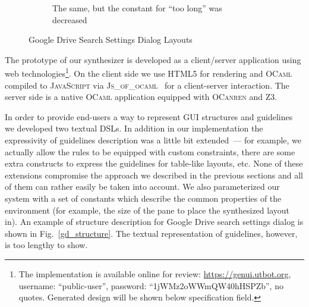 \begin{figure}[t]
\begin{subfigure}[t]{.45\textwidth}
      \caption{The same, but the constant for ``too long'' was decreased}
    \end{subfigure}
    \caption{Google Drive Search Settings Dialog Layouts}
    \label{fig:QMLtwoGuidelines}
\end{figure}

\newcommand{\OCaml}{\textsc{OCaml}\xspace}
\newcommand{\OCanren}{\textsc{OCanren}\xspace}
\newcommand{\noCanren}{\textsc{noCanren}\xspace}
\newcommand{\Zthree}{\textsc{Z3}\xspace}
\newcommand{\JSOO}{\textsc{Js\_of\_ocaml}\xspace}


The prototype of our synthesizer is developed as a \mbox{client}/server application using web technologies\footnote{The implementation is available online
for review: \url{https://genui.utbot.org}, username: ``public-user'', password: ``1jWMz2oWWmQW40hHSPZb'', no quotes.
Generated design will be shown below specification field.}.
On the client side we use \textsc{HTML5} for rendering and \OCaml
compiled to \textsc{JavaScript} via \JSOO~\cite{JSOO} for a client-server interaction. The server side is a native \OCaml application equipped with \OCanren and \Zthree.

In order to provide end-users a way to represent GUI structures and guidelines we developed two textual DSLs. In addition in our implementation
the expressivity of guidelines description was a little bit extended~--- for example, we actually allow the rules to be equipped with custom constraints, there are
some extra constructs to express the guidelines for table-like layouts, etc. None of these extensions compromise the approach we
described in the previous sections and all of them can rather easily be taken into account. We also parameterized our system with
a set of constants which describe the common properties of the environment (for example, the size of the pane to place the synthesized layout in).
An example of structure description for Google Drive search settings dialog is shown in Fig.~\ref{gd_structure}.
The textual representation of guidelines, however, is too lengthy to show.


